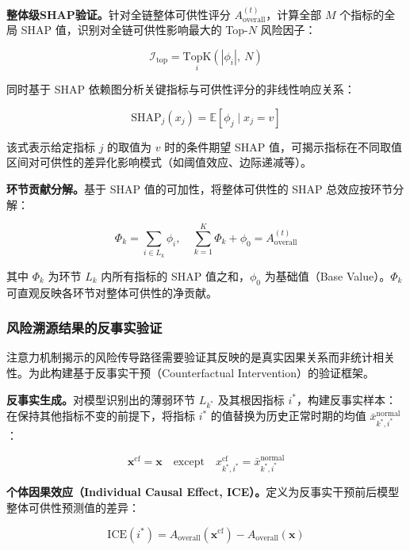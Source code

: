 \textbf{整体级SHAP验证。}针对全链整体可供性评分 $A_{\text{overall}}^{(t)}$，计算全部 $M$ 个指标的全局 SHAP 值，识别对全链可供性影响最大的 Top-$N$ 风险因子：

\begin{equation}
\mathcal{I}_{\text{top}} = \underset{i}{\text{TopK}}\left(|\phi_i|,\ N\right)
\end{equation}

同时基于 SHAP 依赖图分析关键指标与可供性评分的非线性响应关系：

\begin{equation}
\text{SHAP}_j(x_j) = \mathbb{E}[\phi_j \mid x_j = v]
\end{equation}

该式表示给定指标 $j$ 的取值为 $v$ 时的条件期望 SHAP 值，可揭示指标在不同取值区间对可供性的差异化影响模式（如阈值效应、边际递减等）。

\textbf{环节贡献分解。}基于 SHAP 值的可加性，将整体可供性的 SHAP 总效应按环节分解：

\begin{equation}
\Phi_k = \sum_{i\in L_k} \phi_i,\quad \sum_{k=1}^{K} \Phi_k + \phi_0 = A_{\text{overall}}^{(t)}
\end{equation}

其中 $\Phi_k$ 为环节 $L_k$ 内所有指标的 SHAP 值之和，$\phi_0$ 为基础值（Base Value）。$\Phi_k$ 可直观反映各环节对整体可供性的净贡献。

\subsubsection{风险溯源结果的反事实验证}

注意力机制揭示的风险传导路径需要验证其反映的是真实因果关系而非统计相关性。为此构建基于反事实干预（Counterfactual Intervention）的验证框架。

\textbf{反事实生成。}对模型识别出的薄弱环节 $L_{k^*}$ 及其根因指标 $i^*$，构建反事实样本：在保持其他指标不变的前提下，将指标 $i^*$ 的值替换为历史正常时期的均值 $\bar{x}_{k^*,i^*}^{\text{normal}}$：

\begin{equation}
\mathbf{x}^{\text{cf}} = \mathbf{x} \quad \text{except} \quad x_{k^*,i^*}^{\text{cf}} = \bar{x}_{k^*,i^*}^{\text{normal}}
\end{equation}

\textbf{个体因果效应（Individual Causal Effect, ICE）。}定义为反事实干预前后模型整体可供性预测值的差异：

\begin{equation}
\text{ICE}(i^*) = A_{\text{overall}}(\mathbf{x}^{\text{cf}}) - A_{\text{overall}}(\mathbf{x})
\end{equation}


